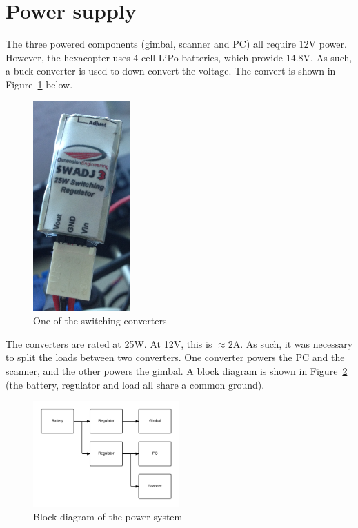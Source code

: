\documentclass[12pt,oneside,a4paper]{book}
\begin{document}
\section{Power supply}
\label{sec:power-supply-cons}

The three powered components (gimbal, scanner and PC) all require 12V
power. However, the hexacopter uses 4 cell LiPo batteries, which
provide 14.8V. As such, a buck converter is used to down-convert the
voltage. The convert is shown in
Figure~\ref{fig:converter} below.

\begin{figure}[h!]
  \centering
  \includegraphics[width=0.33\textwidth]{figs/converter}
  \caption{One of the switching converters}
  \label{fig:converter}
\end{figure}

The converters are rated at 25W. At 12V, this is $\approx 2$A. As
such, it was necessary to split the loads between two converters. One
converter powers the PC and the scanner, and the other powers the
gimbal. A block diagram is shown in Figure~\ref{fig:power} (the
battery, regulator and load all share a common ground).

\begin{figure}[h!]
  \centering
  \includegraphics[width=0.5\textwidth]{figs/power}
  \caption{Block diagram of the power system}
  \label{fig:power}
\end{figure}
\end{document}
